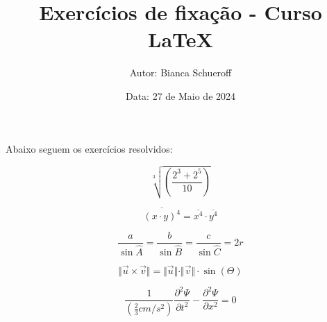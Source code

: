 \documentclass[a4paper, 12pt]{article}
\title{\textbf{Exercícios de fixação - Curso LaTeX}}
\author{Autor: Bianca Schueroff}
\date{Data: 27 de Maio de 2024}
\begin{document}
\maketitle

Abaixo seguem os exercícios resolvidos:

\begin{equation}
\sqrt[3]{\left(\frac{2^{3}+2^{5}}{10}\right)}
\end{equation}

\begin{equation}
\overline{(x\cdot y)^{4}}=\overline{x^{4}}\cdot\overline{y^{4}}
\end{equation}

\begin{equation}
\frac{a}{\sin\widehat{A}}=\frac{b}{\sin\widehat{B}}=\frac{c}{\sin\widehat{C}}=2r
\end{equation}

\begin{equation}
\Vert\vec{u}\times\vec{v}\Vert=\Vert\vec{u}\Vert\cdot\Vert\vec{v}\Vert\cdot\sin(\Theta)
\end{equation}

\begin{equation}
\frac{1}{\left(\frac{2}{3}cm/s^{2}\right)}\frac{\partial^{2}\Psi}{\partial t^{2}}-\frac{\partial^{2}\Psi}{\partial x^{2}}=0
\end{equation}
\end{document}
